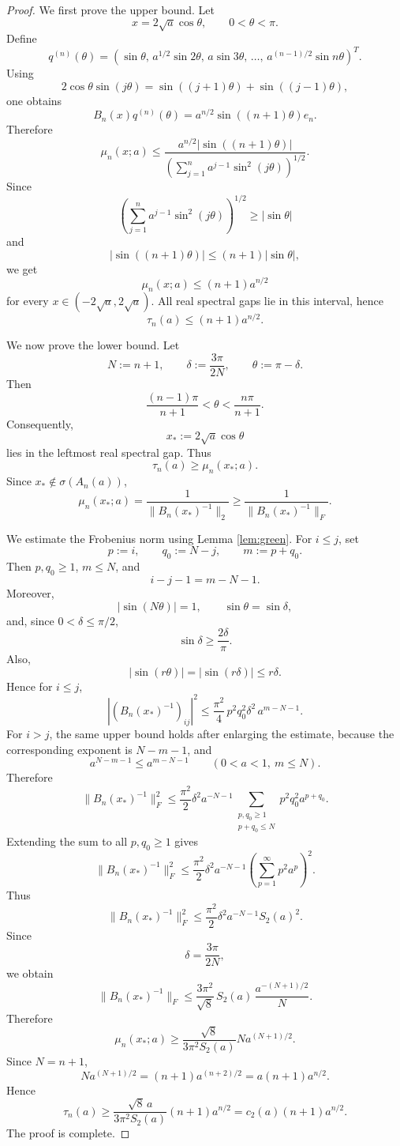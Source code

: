 \documentclass[11pt]{amsart}
\numberwithin{equation}{section}
\begin{document}
\begin{proof}
We first prove the upper bound.  Let
\[
x=2\sqrt a\cos\theta,
\qquad 0<\theta<\pi.
\]
Define
\[
q^{(n)}(\theta)
=
\left(
\sin\theta,\,
a^{1/2}\sin2\theta,\,
a\sin3\theta,\,
\dots,\,
a^{(n-1)/2}\sin n\theta
\right)^T.
\]
Using
\[
2\cos\theta\sin(j\theta)
=
\sin((j+1)\theta)+\sin((j-1)\theta),
\]
one obtains
\[
B_n(x)q^{(n)}(\theta)
=
a^{n/2}\sin((n+1)\theta)e_n.
\]
Therefore
\[
\mu_n(x;a)
\le
\frac{
a^{n/2}|\sin((n+1)\theta)|
}{
\left(\sum_{j=1}^n a^{j-1}\sin^2(j\theta)\right)^{1/2}
}.
\]
Since
\[
\left(\sum_{j=1}^n a^{j-1}\sin^2(j\theta)\right)^{1/2}
\ge |\sin\theta|
\]
and
\[
|\sin((n+1)\theta)|\le(n+1)|\sin\theta|,
\]
we get
\[
\mu_n(x;a)\le(n+1)a^{n/2}
\]
for every \(x\in(-2\sqrt a,2\sqrt a)\).  All real spectral gaps lie in this interval, hence
\[
\tau_n(a)\le(n+1)a^{n/2}.
\]

We now prove the lower bound.  Let
\[
N:=n+1,
\qquad
\delta:=\frac{3\pi}{2N},
\qquad
\theta:=\pi-\delta.
\]
Then
\[
\frac{(n-1)\pi}{n+1}<\theta<\frac{n\pi}{n+1}.
\]
Consequently,
\[
x_*:=2\sqrt a\cos\theta
\]
lies in the leftmost real spectral gap.  Thus
\[
\tau_n(a)\ge \mu_n(x_*;a).
\]
Since \(x_*\notin\sigma(A_n(a))\),
\[
\mu_n(x_*;a)
=
\frac1{\|B_n(x_*)^{-1}\|_2}
\ge
\frac1{\|B_n(x_*)^{-1}\|_F}.
\]

We estimate the Frobenius norm using Lemma \ref{lem:green}.  For \(i\le j\), set
\[
p:=i,\qquad q_0:=N-j,\qquad m:=p+q_0.
\]
Then \(p,q_0\ge1\), \(m\le N\), and
\[
i-j-1=m-N-1.
\]
Moreover,
\[
|\sin(N\theta)|=1,
\qquad
\sin\theta=\sin\delta,
\]
and, since \(0<\delta\le\pi/2\),
\[
\sin\delta\ge \frac{2\delta}{\pi}.
\]
Also,
\[
|\sin(r\theta)|=|\sin(r\delta)|\le r\delta.
\]
Hence for \(i\le j\),
\[
|(B_n(x_*)^{-1})_{ij}|^2
\le
\frac{\pi^2}{4}\,
p^2q_0^2\delta^2\,
a^{m-N-1}.
\]
For \(i>j\), the same upper bound holds after enlarging the estimate, because the corresponding exponent is \(N-m-1\), and
\[
a^{N-m-1}\le a^{m-N-1}
\qquad(0<a<1,\ m\le N).
\]
Therefore
\[
\|B_n(x_*)^{-1}\|_F^2
\le
\frac{\pi^2}{2}\delta^2a^{-N-1}
\sum_{\substack{p,q_0\ge1\\p+q_0\le N}}
p^2q_0^2a^{p+q_0}.
\]
Extending the sum to all \(p,q_0\ge1\) gives
\[
\|B_n(x_*)^{-1}\|_F^2
\le
\frac{\pi^2}{2}\delta^2a^{-N-1}
\left(\sum_{p=1}^{\infty}p^2a^p\right)^2.
\]
Thus
\[
\|B_n(x_*)^{-1}\|_F^2
\le
\frac{\pi^2}{2}\delta^2a^{-N-1}S_2(a)^2.
\]
Since
\[
\delta=\frac{3\pi}{2N},
\]
we obtain
\[
\|B_n(x_*)^{-1}\|_F
\le
\frac{3\pi^2}{\sqrt8}\,
S_2(a)\,
\frac{a^{-(N+1)/2}}{N}.
\]
Therefore
\[
\mu_n(x_*;a)
\ge
\frac{\sqrt8}{3\pi^2S_2(a)}Na^{(N+1)/2}.
\]
Since \(N=n+1\),
\[
Na^{(N+1)/2}
=
(n+1)a^{(n+2)/2}
=
a(n+1)a^{n/2}.
\]
Hence
\[
\tau_n(a)
\ge
\frac{\sqrt8\,a}{3\pi^2S_2(a)}
(n+1)a^{n/2}
=
c_2(a)(n+1)a^{n/2}.
\]
The proof is complete.
\end{proof}
\end{document}
